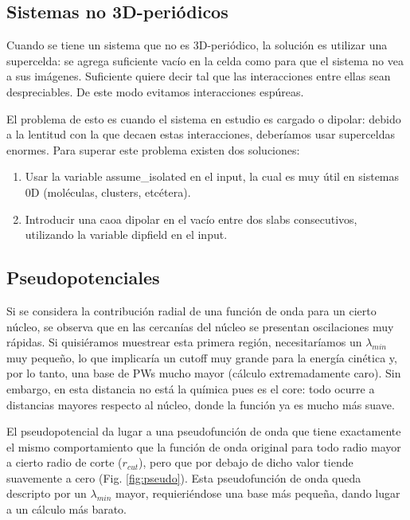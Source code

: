 \subsection{Sistemas no 3D-periódicos}

  Cuando se tiene un sistema que no es 3D-periódico, la solución es utilizar una supercelda: se agrega suficiente vacío en la celda como para que el sistema no vea a sus imágenes. Suficiente quiere decir tal que las interacciones entre ellas sean despreciables. De este modo evitamos interacciones espúreas.

  El problema de esto es cuando el sistema en estudio es cargado o dipolar: debido a la lentitud con la que decaen estas interacciones, deberíamos usar superceldas enormes. Para superar este problema existen dos soluciones:
    \begin{enumerate}
      \item Usar la variable assume\_isolated en el input, la cual es muy útil en sistemas 0D (moléculas, clusters, etcétera).
      \item Introducir una caoa dipolar en el vacío entre dos slabs consecutivos, utilizando la variable dipfield en el input.
    \end{enumerate}

\subsection{Pseudopotenciales}

  Si se considera la contribución radial de una función de onda para un cierto núcleo, se observa que en las cercanías del núcleo se presentan oscilaciones muy rápidas. Si quisiéramos muestrear esta primera región, necesitaríamos un $\lambda_{min}$ muy pequeño, lo que implicaría un cutoff muy grande para la energía cinética y, por lo tanto, una base de PWs mucho mayor (cálculo extremadamente caro). Sin embargo, en esta distancia no está la química pues es el core: todo ocurre a distancias mayores respecto al núcleo, donde la función ya es mucho más suave.

  El pseudopotencial da lugar a una pseudofunción de onda que tiene exactamente el mismo comportamiento que la función de onda original para todo radio mayor a cierto radio de corte ($r_{cut}$), pero que por debajo de dicho valor tiende suavemente a cero (Fig. \ref{fig:pseudo}). Esta pseudofunción de onda queda descripto por un $\lambda_{min}$ mayor, requieriéndose una base más pequeña, dando lugar a un cálculo más barato.

